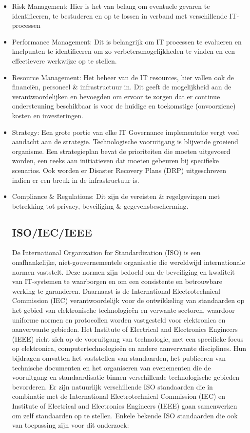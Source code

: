 \begin{itemize}
  \item Risk Management:
  Hier is het van belang om eventuele gevaren te identificeren, te bestuderen en op te lossen in verband met verschillende IT-processen
  \item Performance Management:
  Dit is belangrijk om IT processen te evalueren en knelpunten te identificeren om zo verbetersmogelijkheden te vinden en een effectievere werkwijze op te stellen.
  \item Resource Management:
  Het beheer van de IT resources, hier vallen ook de financiën, personeel \& infrastructuur in. Dit geeft de mogelijkheid aan de verantwoordelijken en bevoegden om ervoor te zorgen dat er continue ondersteuning beschikbaar is voor de huidige en toekomstige (onvoorziene) kosten en investeringen.
  \item Strategy:
  Een grote portie van elke IT Governance implementatie vergt veel aandacht aan de strategie. Technologische vooruitgang is blijvende groeiend organisme. Een strategieplan bevat de prioriteiten die moeten uitgevoerd worden, een reeks aan initiatieven dat moeten gebeuren bij specifieke scenarios. Ook worden er Disaster Recovery Plans (DRP) uitgeschreven indien er een breuk in de infrastructuur is.
  \item Compliance \& Regulations:
  Dit zijn de vereisten \& regelgevingen met betrekking tot privacy, beveiliging \& gegevensbescherming.


\subsection{ISO/IEC/IEEE}
De International Organization for Standardization (ISO) is een onafhankelijke, niet-gouvernementele organisatie die wereldwijd internationale normen vaststelt. Deze normen zijn bedoeld om de beveiliging en kwaliteit van IT-systemen te waarborgen en om een consistente en betrouwbare werking te garanderen.
Daarnaast is de International Electrotechnical Commission (IEC) verantwoordelijk voor de ontwikkeling van standaarden op het gebied van elektronische technologieën en verwante sectoren, waardoor uniforme normen en protocollen worden vastgesteld voor elektronica en aanverwante gebieden.
Het Institute of Electrical and Electronics Engineers (IEEE) richt zich op de vooruitgang van technologie, met een specifieke focus op elektronica, computertechnologieën en andere aanverwante disciplines. Hun bijdragen omvatten het vaststellen van standaarden, het publiceren van technische documenten en het organiseren van evenementen die de vooruitgang en standaardisatie binnen verschillende technologische gebieden bevorderen.
Er zijn natuurlijk verschillende ISO standaarden die in combinatie met de International Electrotechnical Commission (IEC) en Institute of Electrical and Electronics Engineers (IEEE) gaan samenwerken om zelf standaarden op te stellen. Enkele bekende ISO standaarden die ook van toepassing zijn voor dit onderzoek:


\end{itemize}
